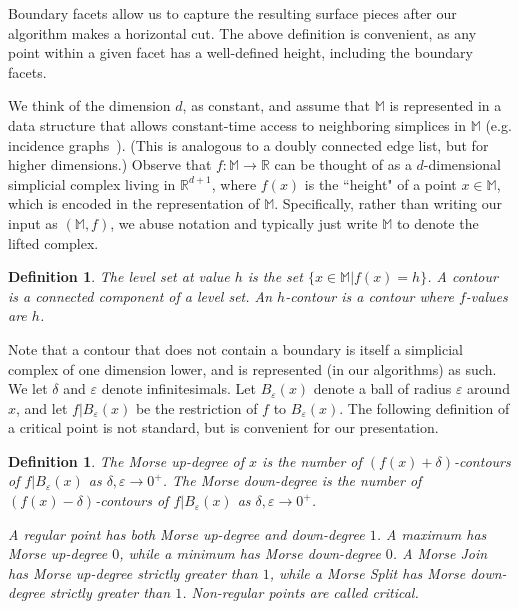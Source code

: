 \documentclass[11pt]{article}
\newtheorem{definition}[theorem]{Definition}
\theoremstyle{definition}
\newcommand{\MM}{\mathbb{M}}
\newcommand{\RR}{\mathbb{R}}
\newcommand{\eps}{\varepsilon}
\begin{document}

Boundary facets allow us to capture the resulting surface pieces after our algorithm makes a horizontal cut. 
The above definition is convenient, as any point within a given facet has a well-defined height, including the boundary facets.

We think of the dimension $d$, as constant, and assume that $\MM$ is represented in a data structure that allows constant-time access to neighboring simplices
in $\MM$ (e.g. incidence graphs~\cite{Ed87}). (This is analogous to a doubly connected edge list, but for higher dimensions.)
Observe that $f:\MM \rightarrow \RR$ can be thought of as a $d$-dimensional simplicial complex living in $\RR^{d+1}$, 
where $f(x)$ is the ``height" of a point $x \in \MM$, which is encoded in the representation of $\MM$. 
Specifically, rather than writing our input as $(\MM,f)$, we abuse notation and typically just write $\MM$ to denote the lifted complex.

\begin{definition} \label{def:level} The \emph{level set} at value $h$ is the set $\{x\in \MM| f(x) = h\}$.
A \emph{contour} is a connected component of a level set. An \emph{$h$-contour} is a contour where $f$-values are $h$.
\end{definition}

Note that a contour that does not contain a boundary is itself a simplicial complex of one dimension lower, and is represented (in our algorithms) as such.
We let $\delta$ and $\eps$ denote infinitesimals. Let $B_\eps(x)$ denote a ball of radius $\eps$ around $x$, and let 
$f|B_\eps(x)$ be the restriction of $f$ to $B_\eps(x)$.
The following definition of a critical point is not standard,
but is convenient for our presentation.

\begin{definition} \label{def:deg} The \emph{Morse up-degree} of $x$ is the number of $(f(x) + \delta)$-contours of $f|B_\eps(x)$
as $\delta, \eps \rightarrow 0^+$. The \emph{Morse down-degree} is the number of $(f(x) - \delta)$-contours of $f|B_\eps(x)$
as $\delta, \eps \rightarrow 0^+$.

A \emph{regular} point has both Morse up-degree and down-degree $1$. A \emph{maximum} has Morse up-degree $0$, while
a \emph{minimum} has Morse down-degree $0$. A \emph{Morse Join} has Morse up-degree strictly greater than $1$,
while a \emph{Morse Split} has Morse down-degree strictly greater than $1$. Non-regular points are called \emph{critical}.
\end{definition}
\end{document}
